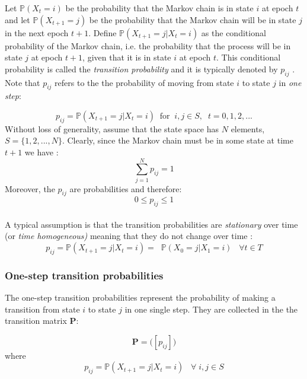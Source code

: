 \documentclass[\main/main.tex]{subfiles}
\begin{document}
Let $\mathds{P}(X_t = i)$ be the probability that the Markov chain is in state $i$ at epoch $t$ and let $\mathds{P}(X_{t+1} = j)$ be the probability that the Markov chain will be in state $j$ in the next epoch $t+1$. Define $\mathds{P}(X_{t+1}
= j|X_{t} = i)$ as the conditional probability of the Markov chain, i.e. the probability that the process will be in state $j$ at epoch $t + 1$, given that it is in state $i$ at epoch $t$. 
This conditional probability is called the \textit{transition probability} and it is typically denoted by $p_{ij}$ \citep{Sheskin2010}. Note that $p_{ij}$  refers to the the probability of moving from state $i$ to state $j$ in \textit{one step}:

\begin{equation}
    p_{ij} = \mathds{P}(X_{t+1} = j |X_t = i) \; \; \text{for}\; \; i,j \in S, \; \; t=0,1,2,...
\end{equation}
Without loss of generality, assume that the state space has $N$ elements, $S=\{1,2,...,N\} $. Clearly, since the Markov chain must be in some state at time $t+1$ we have \citep{Howard1960}:
\begin{equation}
 \sum_{j=1}^N     p_{ij} = 1
\end{equation}
 Moreover, the $p_{ij}$ are probabilities and therefore:
\begin{equation}
 0 \leq p_{ij} \leq 1
\end{equation}\\

A typical assumption is that the transition probabilities are \textit{stationary} over time (or \textit{time homogeneous)} meaning that they do not change over time \citep{Sheskin2010}:
\begin{equation}
    p_{ij} = \mathds{P}(X_{t+1} = j |X_t = i)  = \; \; \mathds{P}(X_{0} = j |X_1 = i) \;\;\; \forall t \in T
\end{equation}

\subsubsection{One-step transition probabilities}
\noindent The one-step transition probabilities represent the probability of making a transition from state $i$ to state $j$ in one single step. They are collected in the the transition matrix $\mathbf{P}$:


\begin{equation}
   \mathbf{P} = \Big([ p_{ij}] \Big)
\end{equation}
where
\begin{equation}
    p_{ij} = \mathds{P} ( X_{t+1} = j | X_t = i) \;\;\; \forall \; i,j \in S
\end{equation}
\end{document}
